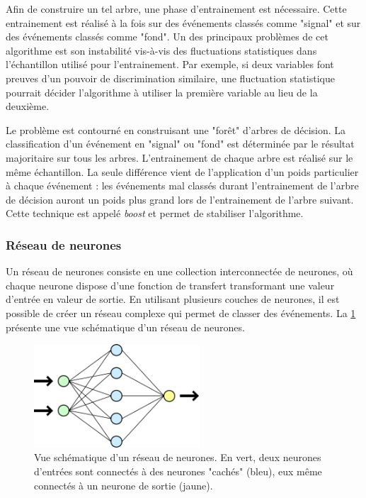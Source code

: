 Afin de construire un tel arbre, une phase d'entrainement est nécessaire. Cette entrainement est réalisé à la fois sur des événements classés comme "signal" et sur des événements classés comme "fond". Un des principaux problèmes de cet algorithme est son instabilité vis-à-vis des fluctuations statistiques dans l'échantillon utilisé pour l'entrainement. Par exemple, si deux variables font preuves d'un pouvoir de discrimination similaire, une fluctuation statistique pourrait décider l'algorithme à utiliser la première variable au lieu de la deuxième.

Le problème est contourné en construisant une "forêt" d'arbres de décision. La classification d'un événement en "signal" ou "fond" est déterminée par le résultat majoritaire sur tous les arbres. L'entrainement de chaque arbre est réalisé sur le même échantillon. La seule différence vient de l'application d'un poids particulier à chaque événement : les événements mal classés durant l'entrainement de l'arbre de décision auront un poids plus grand lors de l'entrainement de l'arbre suivant. Cette technique est appelé \emph{boost} \citep{Freund1997119} et permet de stabiliser l'algorithme.

\subsubsection{Réseau de neurones}

Un réseau de neurones consiste en une collection interconnectée de neurones, où chaque neurone dispose d'une fonction de transfert transformant une valeur d'entrée en valeur de sortie. En utilisant plusieurs couches de neurones, il est possible de créer un réseau complexe qui permet de classer des événements. La \cref{fig:nn} présente une vue schématique d'un réseau de neurones.

\begin{figure}[tbp] \centering
    \includegraphics[width=0.55\textwidth]{chapitre6/figs/Neural_network.pdf}
    \caption{Vue schématique d'un réseau de neurones. En vert, deux neurones d'entrées sont connectés à des neurones "cachés" (bleu), eux même connectés à un neurone de sortie (jaune).}
    \label{fig:nn}
\end{figure}

